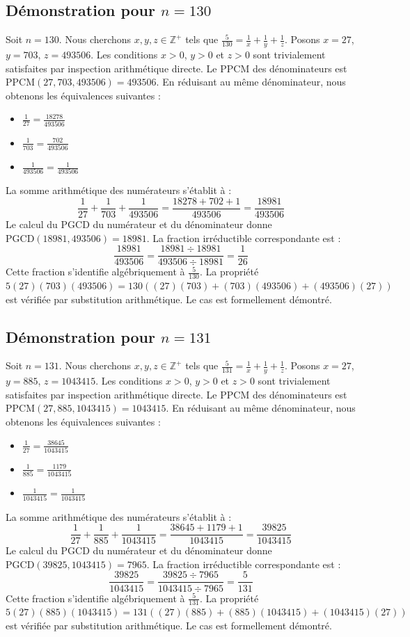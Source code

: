 \documentclass[12pt,a4paper]{article}
\begin{document}
\subsection{Démonstration pour $n = 130$}
Soit $n = 130$. Nous cherchons $x, y, z \in \mathbb{Z}^{+}$ tels que $\frac{5}{130} = \frac{1}{x} + \frac{1}{y} + \frac{1}{z}$.
Posons $x = 27$, $y = 703$, $z = 493506$.
Les conditions $x > 0$, $y > 0$ et $z > 0$ sont trivialement satisfaites par inspection arithmétique directe.
Le PPCM des dénominateurs est $\text{PPCM}(27, 703, 493506) = 493506$.
En réduisant au même dénominateur, nous obtenons les équivalences suivantes :
\begin{itemize}
    \item $\frac{1}{27} = \frac{18278}{493506}$
    \item $\frac{1}{703} = \frac{702}{493506}$
    \item $\frac{1}{493506} = \frac{1}{493506}$
\end{itemize}
La somme arithmétique des numérateurs s'établit à :
$$ \frac{1}{27} + \frac{1}{703} + \frac{1}{493506} = \frac{18278 + 702 + 1}{493506} = \frac{18981}{493506} $$
Le calcul du PGCD du numérateur et du dénominateur donne $\text{PGCD}(18981, 493506) = 18981$.
La fraction irréductible correspondante est :
$$ \frac{18981}{493506} = \frac{18981 \div 18981}{493506 \div 18981} = \frac{1}{26} $$
Cette fraction s'identifie algébriquement à $\frac{5}{130}$.
La propriété $5(27)(703)(493506) = 130((27)(703) + (703)(493506) + (493506)(27))$ est vérifiée par substitution arithmétique.
Le cas est formellement démontré.

\subsection{Démonstration pour $n = 131$}
Soit $n = 131$. Nous cherchons $x, y, z \in \mathbb{Z}^{+}$ tels que $\frac{5}{131} = \frac{1}{x} + \frac{1}{y} + \frac{1}{z}$.
Posons $x = 27$, $y = 885$, $z = 1043415$.
Les conditions $x > 0$, $y > 0$ et $z > 0$ sont trivialement satisfaites par inspection arithmétique directe.
Le PPCM des dénominateurs est $\text{PPCM}(27, 885, 1043415) = 1043415$.
En réduisant au même dénominateur, nous obtenons les équivalences suivantes :
\begin{itemize}
    \item $\frac{1}{27} = \frac{38645}{1043415}$
    \item $\frac{1}{885} = \frac{1179}{1043415}$
    \item $\frac{1}{1043415} = \frac{1}{1043415}$
\end{itemize}
La somme arithmétique des numérateurs s'établit à :
$$ \frac{1}{27} + \frac{1}{885} + \frac{1}{1043415} = \frac{38645 + 1179 + 1}{1043415} = \frac{39825}{1043415} $$
Le calcul du PGCD du numérateur et du dénominateur donne $\text{PGCD}(39825, 1043415) = 7965$.
La fraction irréductible correspondante est :
$$ \frac{39825}{1043415} = \frac{39825 \div 7965}{1043415 \div 7965} = \frac{5}{131} $$
Cette fraction s'identifie algébriquement à $\frac{5}{131}$.
La propriété $5(27)(885)(1043415) = 131((27)(885) + (885)(1043415) + (1043415)(27))$ est vérifiée par substitution arithmétique.
Le cas est formellement démontré.
\end{document}
